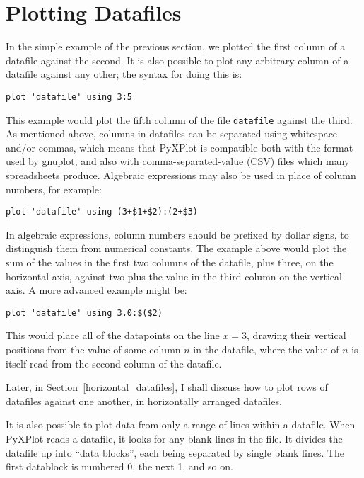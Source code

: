 \section{Plotting Datafiles}
\label{plot_datafiles}

In the simple example of the previous section, we plotted the first column of a
datafile against the second. It is also possible to plot any arbitrary column
of a datafile against any other; the syntax for doing this is:

\begin{verbatim}
plot 'datafile' using 3:5
\end{verbatim}

\noindent This example would plot the fifth column of the file
\texttt{datafile} against the third. As mentioned above, columns in datafiles
can be separated using whitespace and/or commas, which means that PyXPlot is
compatible both with the format used by gnuplot, and also with
comma-separated-value (CSV) files which many
spreadsheets produce. Algebraic
expressions may also be used in place of column numbers, for example:

\begin{verbatim}
plot 'datafile' using (3+$1+$2):(2+$3)
\end{verbatim}

\noindent In algebraic expressions, column numbers should be prefixed by dollar
signs, to distinguish them from numerical constants. The example above would
plot the sum of the values in the first two columns of the datafile, plus
three, on the horizontal axis, against two plus the value in the third column
on the vertical axis. A more advanced example might be:

\newpage %

\begin{verbatim}
plot 'datafile' using 3.0:$($2)
\end{verbatim}

\noindent This would place all of the datapoints on the line $x=3$, drawing
their vertical positions from the value of some column $n$ in the datafile,
where the value of $n$ is itself read from the second column of the datafile.

Later, in Section~\ref{horizontal_datafiles}, I shall discuss how to plot rows
of datafiles against one another, in horizontally arranged datafiles.

It is also possible to plot data from only a range of lines within a datafile.
When PyXPlot reads a datafile, it looks for any blank lines in the file. It
divides the datafile up into ``data blocks'', each being separated by single
blank lines. The first datablock is numbered 0, the next 1, and so on.

